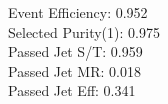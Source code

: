 Event Efficiency:   0.952\\ 
Selected Purity(1): 0.975\\ 
Passed Jet S/T:     0.959\\ 
Passed Jet MR:      0.018\\ 
Passed Jet Eff:     0.341